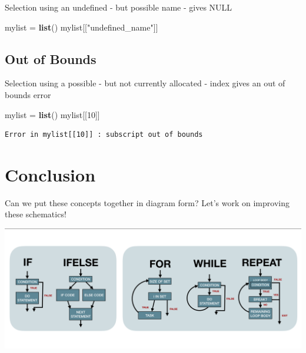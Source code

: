 \documentclass[]{book}
\newenvironment{Shaded}{\begin{snugshade}}{\end{snugshade}}
\newcommand{\DecValTok}[1]{\textcolor[rgb]{0.00,0.00,0.81}{#1}}
\newcommand{\KeywordTok}[1]{\textcolor[rgb]{0.13,0.29,0.53}{\textbf{#1}}}
\newcommand{\NormalTok}[1]{#1}
\newcommand{\StringTok}[1]{\textcolor[rgb]{0.31,0.60,0.02}{#1}}
\begin{document}
Selection using an undefined - but possible name - gives NULL

\begin{Shaded}
\begin{Highlighting}[]
\NormalTok{mylist =}\StringTok{ }\KeywordTok{list}\NormalTok{()}
\NormalTok{mylist[[}\StringTok{"undefined_name"}\NormalTok{]]}
\end{Highlighting}
\end{Shaded}

\hypertarget{oob-5}{%
\subsection*{Out of Bounds}\label{oob-5}}

Selection using a possible - but not currently allocated - index gives an out of bounds error

\begin{Shaded}
\begin{Highlighting}[]
\NormalTok{mylist =}\StringTok{ }\KeywordTok{list}\NormalTok{()}
\NormalTok{mylist[[}\DecValTok{10}\NormalTok{]]}
\end{Highlighting}
\end{Shaded}

\begin{verbatim}
Error in mylist[[10]] : subscript out of bounds 
\end{verbatim}

\hypertarget{conclusion-5}{%
\section*{Conclusion}\label{conclusion-5}}

Can we put these concepts together in diagram form? Let's work on improving these schematics!

\includegraphics[width=40in]{images/controlflow}
\end{document}
